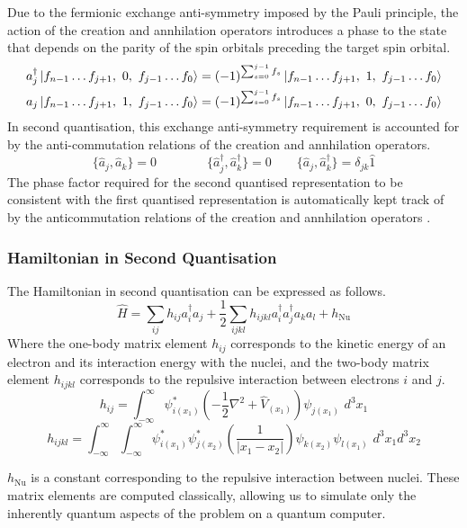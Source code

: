 Due to the fermionic exchange anti-symmetry imposed by the Pauli principle, the action of the creation and annhilation operators introduces a phase to the state that depends on the parity of the spin orbitals preceding the target spin orbital.
\begin{align*}
    a_j^\dagger \ket{f_{n-1} \dots
    f_{j+1},\,\, 0,\,\, f_{j-1} \dots f_0} &=
    (-1)^{\sum_{s=0}^{j-1} f_s}
    \ket{f_{n-1} \dots f_{j+1},\,\, 1,\,\, f_{j-1} \dots f_0} \\
    a_j \ket{f_{n-1} \dots f_{j+1},\,\, 1,\,\, f_{j-1} \dots f_0} &=
    (-1)^{\sum_{s=0}^{j-1} f_s}
    \ket{f_{n-1} \dots f_{j+1},\,\, 0,\,\, f_{j-1} \dots f_0}
\end{align*}
In second quantisation, this exchange anti-symmetry requirement is accounted for by the anti-commutation relations of the creation and annhilation operators.
\begin{equation*}
    \{ \hat a_{j}, \hat a_{k} \} = 0 \qquad \qquad
    \{ \hat a_{j}^{\dagger}, \hat a_{k}^{\dagger} \} = 0 \qquad
    \{ \hat a_{j}, \hat a_{k}^{\dagger} \} = \delta_{jk} \hat{1}
\end{equation*}
The phase factor required for the second quantised representation to be consistent with the first quantised representation is automatically kept track of by the anticommutation relations of the creation and annhilation operators \cite{Helgaker2000}.

\subsubsection{Hamiltonian in Second Quantisation}

The Hamiltonian in second quantisation can be expressed as follows.
\begin{equation*}
    \hat H =
    \sum_{ij} h_{ij} a^\dagger_i a_j +
    \frac{1}{2} \sum_{ijkl} h_{ijkl} a^\dagger_i a^\dagger_j a_k a_l +
    h_\text{Nu}
\end{equation*}
Where the one-body matrix element $h_{ij}$ corresponds to the kinetic energy of an electron and its interaction energy with the nuclei, and the two-body matrix element $h_{ijkl}$ corresponds to the repulsive interaction between electrons $i$ and $j$.
\begin{equation*}
h_{ij} = \int^\infty_{-\infty} \psi^*_{i(x_1)} \left( - \frac{1}{2} \nabla^2 + \hat V_{(x_1)} \right) \psi_{j(x_1)} \,\, d^3 x_1
\end{equation*}
\begin{equation*}
h_{ijkl} = \int^\infty_{-\infty} \int^\infty_{-\infty} \psi^*_{i(x_1)} \psi^*_{j(x_2)} \left( \frac{1}{|x_1 - x_2|} \right) \psi_{k(x_2)} \psi_{l(x_1)} \,\, d^3 x_1 d^3 x_2
\end{equation*}

$h_\text{Nu}$ is a constant corresponding to the repulsive interaction between nuclei. These matrix elements are computed classically, allowing us to simulate only the inherently quantum aspects of the problem on a quantum computer.

